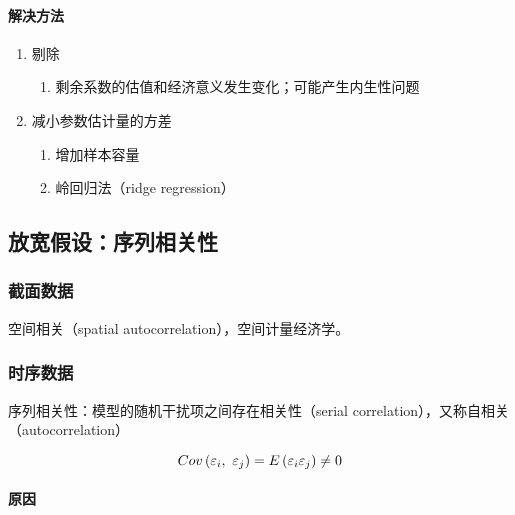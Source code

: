 \documentclass[12pt]{book}
\begin{document}
\paragraph{解决方法}



\begin{enumerate}[1.]
    \item 剔除
          \begin{enumerate}[(1)]
              \item 剩余系数的估值和经济意义发生变化；可能产生内生性问题
          \end{enumerate}
    \item 减小参数估计量的方差
          \begin{enumerate}[(1)]
              \item 增加样本容量
              \item 岭回归法（ridge regression）
          \end{enumerate}
\end{enumerate}






\subsection{放宽假设：序列相关性}

\subsubsection{截面数据}
空间相关（spatial autocorrelation），空间计量经济学。




\subsubsection{时序数据}







序列相关性：模型的随机干扰项之间存在相关性（serial correlation），又称自相关（autocorrelation）

$$
Cov\left(\varepsilon_i,\ \varepsilon_j\right)=E\left(\varepsilon_i\varepsilon_j\right)\neq0\\
$$

\paragraph{原因}
\end{document}
